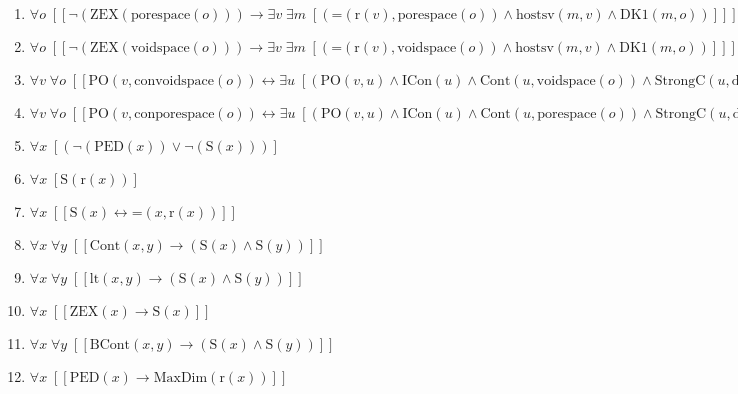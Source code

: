 \documentclass{article}
\begin{document}
\begin{enumerate}
\item $\forall o\;  \left[ \left[ \neg \left(\textrm{ZEX}(\textrm{porespace}(o))\right) \rightarrow \exists v\; \exists m\;  \left[ \left(\textrm{=}(\textrm{r}(v),\textrm{porespace}(o)) \land \textrm{hostsv}(m,v) \land \textrm{DK1}(m,o)\right) \right] \right] \right]$
\item $\forall o\;  \left[ \left[ \neg \left(\textrm{ZEX}(\textrm{voidspace}(o))\right) \rightarrow \exists v\; \exists m\;  \left[ \left(\textrm{=}(\textrm{r}(v),\textrm{voidspace}(o)) \land \textrm{hostsv}(m,v) \land \textrm{DK1}(m,o)\right) \right] \right] \right]$
\item $\forall v\; \forall o\;  \left[ \left[ \textrm{PO}(v,\textrm{convoidspace}(o)) \leftrightarrow \exists u\;  \left[ \left(\textrm{PO}(v,u) \land \textrm{ICon}(u) \land \textrm{Cont}(u,\textrm{voidspace}(o)) \land \textrm{StrongC}(u,\textrm{difference}(CUni,\textrm{sum}(\textrm{r}(o),\textrm{voidspace}(o))))\right) \right] \right] \right]$
\item $\forall v\; \forall o\;  \left[ \left[ \textrm{PO}(v,\textrm{conporespace}(o)) \leftrightarrow \exists u\;  \left[ \left(\textrm{PO}(v,u) \land \textrm{ICon}(u) \land \textrm{Cont}(u,\textrm{porespace}(o)) \land \textrm{StrongC}(u,\textrm{difference}(CUni,\textrm{sum}(\textrm{r}(o),\textrm{porespace}(o))))\right) \right] \right] \right]$
\item $\forall x\;  \left[ \left(\neg \left(\textrm{PED}(x)\right) \lor \neg \left(\textrm{S}(x)\right)\right) \right]$
\item $\forall x\;  \left[ \textrm{S}(\textrm{r}(x)) \right]$
\item $\forall x\;  \left[ \left[ \textrm{S}(x) \leftrightarrow \textrm{=}(x,\textrm{r}(x)) \right] \right]$
\item $\forall x\; \forall y\;  \left[ \left[ \textrm{Cont}(x,y) \rightarrow \left(\textrm{S}(x) \land \textrm{S}(y)\right) \right] \right]$
\item $\forall x\; \forall y\;  \left[ \left[ \textrm{lt}(x,y) \rightarrow \left(\textrm{S}(x) \land \textrm{S}(y)\right) \right] \right]$
\item $\forall x\;  \left[ \left[ \textrm{ZEX}(x) \rightarrow \textrm{S}(x) \right] \right]$
\item $\forall x\; \forall y\;  \left[ \left[ \textrm{BCont}(x,y) \rightarrow \left(\textrm{S}(x) \land \textrm{S}(y)\right) \right] \right]$
\item $\forall x\;  \left[ \left[ \textrm{PED}(x) \rightarrow \textrm{MaxDim}(\textrm{r}(x)) \right] \right]$

\end{enumerate}
\end{document}
